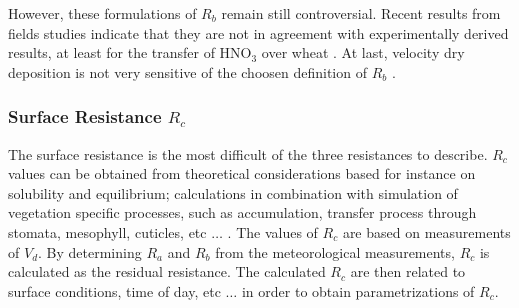 \medskip

However, these formulations of $R_b$ remain still controversial. 
Recent results from fields studies 
indicate that they
are not in agreement with experimentally derived results, at least
for the transfer of HNO$_3$
over wheat \citep{Muller1993}.
At last, velocity dry deposition is not very sensitive of the choosen
definition of $R_b$ \citep{Ganzeveld1995}.
\subsubsection*{Surface Resistance $R_c$}

The surface resistance is the most difficult of the three resistances to
describe. $R_c$ values can be obtained from theoretical considerations based
for instance on solubility and equilibrium; calculations in combination with
simulation of vegetation specific processes, such as accumulation, transfer
process through stomata, mesophyll, cuticles, etc $\ldots$
\citep{Baldocchi1987,Wesely1989}. The values of $R_c$ are based on
measurements of $V_d$. By determining $R_a$ and $R_b$ from the meteorological
measurements, $R_c$ is calculated as the residual resistance. The calculated
$R_c$ are then related to surface conditions, time of day, etc $\ldots$ in
order to obtain parametrizations of $R_c$.

